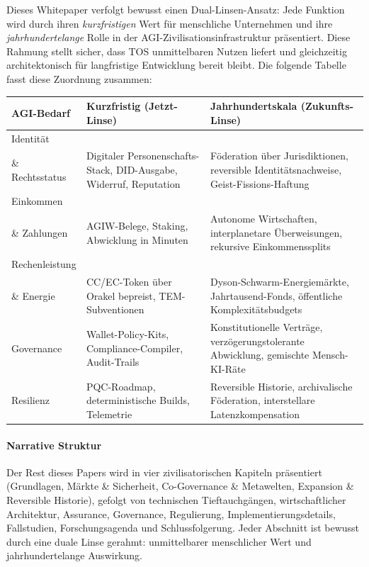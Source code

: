 \documentclass[11pt]{article}
\begin{document}
Dieses Whitepaper verfolgt bewusst einen Dual-Linsen-Ansatz: Jede Funktion wird durch ihren \emph{kurzfristigen} Wert für menschliche Unternehmen und ihre \emph{jahrhundertelange} Rolle in der AGI-Zivilisationsinfrastruktur präsentiert. Diese Rahmung stellt sicher, dass TOS unmittelbaren Nutzen liefert und gleichzeitig architektonisch für langfristige Entwicklung bereit bleibt. Die folgende Tabelle fasst diese Zuordnung zusammen:

\begin{longtable}{@{}p{}p{}p{}@{}}
\toprule
\textbf{AGI-Bedarf} & \textbf{Kurzfristig (Jetzt-Linse)} & \textbf{Jahrhundertskala (Zukunfts-Linse)} \\\midrule
Identität \\ \& Rechtsstatus & Digitaler Personenschafts-Stack, DID-Ausgabe, Widerruf, Reputation & Föderation über Jurisdiktionen, reversible Identitätsnachweise, Geist-Fissions-Haftung \\
Einkommen \\ \& Zahlungen & AGIW-Belege, Staking, Abwicklung in Minuten & Autonome Wirtschaften, interplanetare Überweisungen, rekursive Einkommenssplits \\
Rechenleistung \\ \& Energie & CC/EC-Token über Orakel bepreist, TEM-Subventionen & Dyson-Schwarm-Energiemärkte, Jahrtausend-Fonds, öffentliche Komplexitätsbudgets \\
Governance & Wallet-Policy-Kits, Compliance-Compiler, Audit-Trails & Konstitutionelle Verträge, verzögerungstolerante Abwicklung, gemischte Mensch-KI-Räte \\
Resilienz & PQC-Roadmap, deterministische Builds, Telemetrie & Reversible Historie, archivalische Föderation, interstellare Latenzkompensation \\\bottomrule
\end{longtable}

\paragraph{Narrative Struktur} Der Rest dieses Papers wird in vier zivilisatorischen Kapiteln präsentiert (Grundlagen, Märkte \& Sicherheit, Co-Governance \& Metawelten, Expansion \& Reversible Historie), gefolgt von technischen Tieftauchgängen, wirtschaftlicher Architektur, Assurance, Governance, Regulierung, Implementierungsdetails, Fallstudien, Forschungsagenda und Schlussfolgerung. Jeder Abschnitt ist bewusst durch eine duale Linse gerahmt: unmittelbarer menschlicher Wert und jahrhundertelange Auswirkung.
\end{document}
